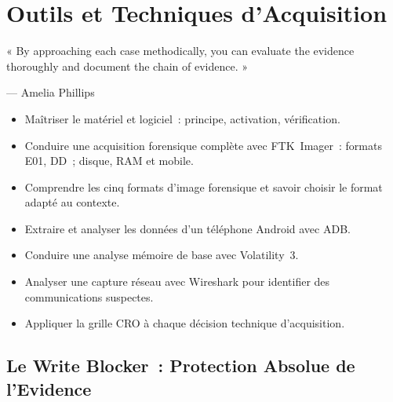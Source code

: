 
\chapter{Outils et Techniques d'Acquisition}
\label{chap:acq}

\epigraph{%
    « By approaching each case methodically, you can evaluate the evidence
    thoroughly and document the chain of evidence. »%
}{--- Amelia Phillips}


\begin{boxobjectifs}
\begin{itemize}
    \item Maîtriser le  matériel et logiciel~:
          principe, activation, vérification.
    \item Conduire une acquisition forensique complète avec FTK~Imager~:
          formats E01, DD~; disque, RAM et mobile.
    \item Comprendre les cinq formats d'image forensique et savoir choisir
          le format adapté au contexte.
    \item Extraire et analyser les données d'un téléphone Android avec ADB.
    \item Conduire une analyse mémoire de base avec Volatility~3.
    \item Analyser une capture réseau avec Wireshark pour identifier
          des communications suspectes.
    \item Appliquer la grille CRO à chaque décision technique d'acquisition.
\end{itemize}
\end{boxobjectifs}

\bigskip

\section{Le Write Blocker~: Protection Absolue de l'Evidence}
\label{sec:write-blocker}

